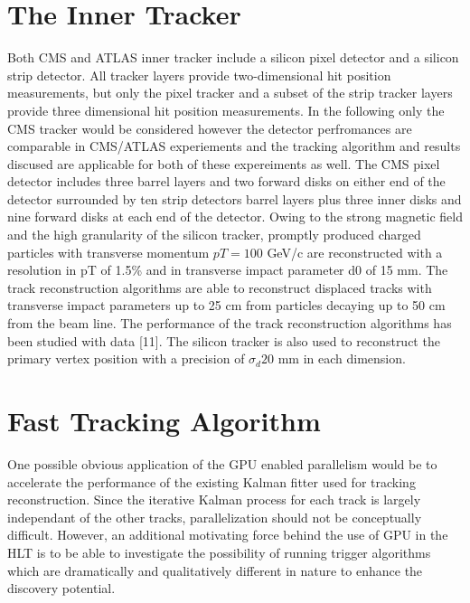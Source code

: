 \documentclass{JINST}
\begin{document}
\section{The Inner Tracker}
Both CMS and ATLAS inner tracker include a silicon pixel detector and a silicon strip detector.
All tracker layers provide two-dimensional hit position measurements, but only the pixel tracker
 and a subset of the strip tracker layers provide three dimensional hit position measurements.
In the following only the CMS tracker would be considered however the detector perfromances are comparable
in CMS/ATLAS experiements and the tracking algorithm and results discused are applicable for both of 
these expereiments as well. The CMS pixel detector includes three barrel layers and two forward disks
on either end of the detector surrounded by  ten strip detectors barrel layers plus three 
inner disks and nine forward disks at each end of the detector.
Owing to the strong magnetic field and the high granularity of the silicon tracker, 
promptly produced charged particles with transverse momentum $pT = 100$ GeV/c are reconstructed 
with a resolution in pT of 1.5\% and in transverse impact
parameter d0 of 15 mm. The track reconstruction algorithms are able to reconstruct displaced
tracks with transverse impact parameters up to 25 cm from particles decaying up to 50 cm
from the beam line. The performance of the track reconstruction algorithms has been studied
with data [11]. The silicon tracker is also used to reconstruct the primary vertex position with
 a precision of $\sigma_d 20$ mm in each dimension. 



\section{Fast Tracking Algorithm}

One possible obvious application of the GPU enabled parallelism would be to
accelerate the performance of the existing Kalman fitter used for tracking reconstruction.
Since the iterative Kalman process for each track is largely independant of the other tracks,
parallelization should not be conceptually difficult. However, an additional motivating 
force behind the use of GPU in the HLT is to be able to investigate the possibility of 
running trigger algorithms which are dramatically and qualitatively different in nature 
to enhance the discovery potential.
\end{document}
